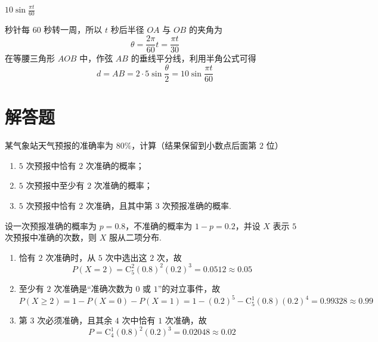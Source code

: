 \begin{answer}
\(10\sin\frac{\pi t}{60}\)
\end{answer}

\begin{solution}
秒针每 \(60\) 秒转一周，所以 \(t\) 秒后半径 \(OA\) 与 \(OB\) 的夹角为
\[
\theta=\frac{2\pi}{60}t=\frac{\pi t}{30}
\]
在等腰三角形 \(AOB\) 中，作弦 \(AB\) 的垂线平分线，利用半角公式可得
\[
d=AB=2\cdot5\sin\frac{\theta}{2}
=10\sin\frac{\pi t}{60}
\]
\end{solution}

\section{解答题}

\begin{problem}
某气象站天气预报的准确率为 \(80\%\)，计算（结果保留到小数点后面第 \(2\) 位）

\begin{enumerate}
\item \(5\) 次预报中恰有 \(2\) 次准确的概率；
\item \(5\) 次预报中至少有 \(2\) 次准确的概率；
\item \(5\) 次预报中恰有 \(2\) 次准确，且其中第 \(3\) 次预报准确的概率.
\end{enumerate}
\end{problem}

\begin{solution}
设一次预报准确的概率为 \(p=0.8\)，不准确的概率为 \(1-p=0.2\)，并设 \(X\) 表示 \(5\) 次预报中准确的次数，则 \(X\) 服从二项分布.

\begin{enumerate}
\item 恰有 \(2\) 次准确时，从 \(5\) 次中选出这 \(2\) 次，故
\[
P(X=2)=\mathrm C_5^2(0.8)^2(0.2)^3=0.0512\approx0.05
\]
\item 至少有 \(2\) 次准确是“准确次数为 \(0\) 或 \(1\)”的对立事件，故
\[
P(X\geqslant2)=1-P(X=0)-P(X=1)=1-(0.2)^5-\mathrm C_5^1(0.8)(0.2)^4=0.99328\approx0.99
\]
\item 第 \(3\) 次必须准确，且其余 \(4\) 次中恰有 \(1\) 次准确，故
\[
P=\mathrm C_4^1(0.8)^2(0.2)^3=0.02048\approx0.02
\]
\end{enumerate}
\end{solution}

